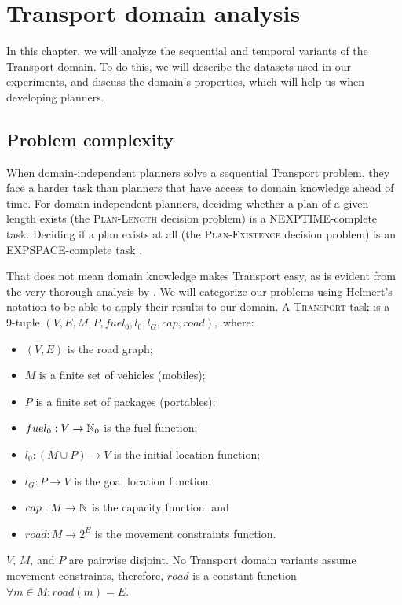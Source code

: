 \chapter{Transport domain analysis}

In this chapter, we will analyze the sequential and temporal variants of the Transport domain. To do this, we will describe the datasets
used in our experiments,
and discuss the domain's properties, which will help us when developing planners.

\section{Problem complexity}

When domain-independent planners solve a sequential Transport problem,
they face a harder task than planners that have access to domain knowledge ahead of time.
For domain-independent planners, deciding whether a plan of a given length exists
(the \textsc{Plan-Length} decision problem) is
a NEXPTIME-complete task.
Deciding if a plan exists at all (the \textsc{Plan-Existence} decision problem)
is an EXPSPACE-complete task \citep[Table~3.2]{Ghallab2004}.

That does not mean domain knowledge makes Transport easy, as is evident from
the very thorough analysis by \citet{Helmert2001, Helmert2001a}.
We will categorize our problems using Helmert's notation to
be able to apply their results to our domain.
A \textsc{Transport} task is a 9-tuple $(V, E, M, P, fuel_0, l_0, l_G, cap, road),$
where:
\begin{itemize}
\item $(V, E)$ is the road graph;
\item $M$ is a finite set of vehicles (mobiles);
\item $P$ is a finite set of packages (portables);
\item $fuel_0 : V \to \mathbb{N}_0$ is the fuel function;
\item $l_0: (M \cup P) \to V$ is the initial location function;
\item $l_G: P \to V$ is the goal location function;
\item $cap: M \to \mathbb{N}$ is the capacity function; and
\item $road: M \to 2^E$ is the movement constraints function.
\end{itemize}
$V$, $M$, and $P$ are pairwise disjoint.
No Transport domain variants assume movement constraints, therefore, $road$ is a constant
function $\forall m \in M : road(m) = E$.

